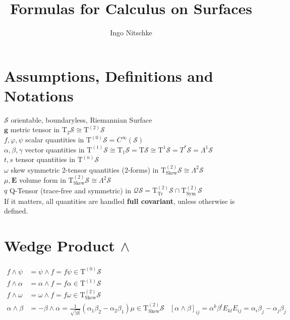 \documentclass[a4paper,10pt]{scrartcl}
\title{Formulas for Calculus on Surfaces}
\author{Ingo Nitschke}
\newcommand{\surf}{\mathcal{S}}
\newcommand{\T}{\mathrm{T}}
\newcommand{\tps}[1]{\T^{(#1)}\surf}
\newcommand{\tzs}{\tps{0}}
\newcommand{\tos}{\tps{1}}
\newcommand{\tts}{\tps{2}}
\newcommand{\tns}{\tps{n}}
\newcommand{\tpsprop}[2]{\T^{(#1)}_{#2}\surf}
\newcommand{\ttssym}{\tpsprop{2}{\mathrm{Sym}}}
\newcommand{\ttsskew}{\tpsprop{2}{\mathrm{Skew}}}
\newcommand{\ttstrfree}{\tpsprop{2}{\mathrm{Tr}}}
\newcommand{\qts}{\mathcal{Q}\surf}
\newcommand{\volval}{\sqrt{| g |}}
\newcommand{\gb}{\mathbf{g}}
\newcommand{\Eb}{\mathbf{E}}
\begin{document}
\maketitle
\tableofcontents

\section{Assumptions, Definitions and Notations}
\( \surf \) \dotfill orientable, boundaryless, Riemannian Surface\\
\( \gb \) \dotfill metric tensor in \( \T_{2}\surf \cong \tts \)\\
\( f,\varphi,\psi \) \dotfill scalar quantities in \( \tzs = C^{\infty}\left( \surf \right)\)\\
\( \alpha,\beta,\gamma \) \dotfill vector quantities in \( \tos \cong \T_{1}\surf = \T\surf \cong \T^{1}\surf = T^{*}\surf = \Lambda^{1}\surf \)\\
\( t,s \) \dotfill tensor quantities in \( \tns \)\\
\( \omega \) \dotfill skew symmetric 2-tensor quantities (2-forms) in \( \ttsskew \cong \Lambda^{2}\surf \)\\
\( \mu, \Eb\) \dotfill volume form in \( \ttsskew \cong \Lambda^{2}\surf \)\\
\( q \) \dotfill Q-Tensor (trace-free and symmetric) in \( \qts = \ttstrfree \cap \ttssym \)\\
If it matters, all quantities are handled \textbf{full covariant}, unless otherwise is defined.


\section{Wedge Product \( \wedge \)}
\begin{align*}
  f\wedge\psi &= \psi\wedge f  = f\psi \in \tzs \\
  f\wedge\alpha &= \alpha\wedge f = f\alpha \in \tos\\
  f\wedge\omega &= \omega\wedge f = f\omega \in \ttsskew\\
  \alpha\wedge\beta &= -\beta\wedge\alpha = \frac{1}{\volval}\left( \alpha_{1}\beta_{2} - \alpha_{2}\beta_{1} \right)\mu \in \ttsskew
                  & \left[ \alpha\wedge\beta \right]_{ij} = \alpha^{k}\beta^{l}E_{kl}E_{ij}
                                                          = \alpha_{i}\beta_{j} - \alpha_{j}\beta_{j}
\end{align*}
\end{document}
